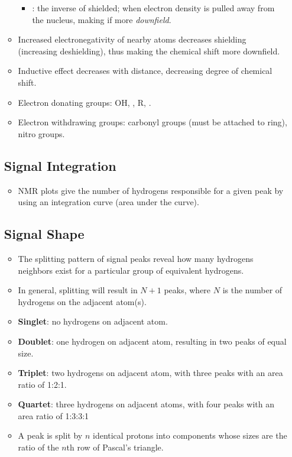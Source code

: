 \begin{itemize}
\begin{itemize}
\begin{itemize}
            \item {}: the inverse of shielded; when electron density is pulled away from the nucleus, making if more \emph{downfield}. 
          \end{itemize}
        \item Increased electronegativity of nearby atoms decreases shielding (increasing deshielding), thus making the chemical shift more downfield.
        \item Inductive effect decreases with distance, decreasing degree of chemical shift.
        \item Electron donating groups: OH, , R, .
        \item Electron withdrawing groups: carbonyl groups (must be attached to ring), nitro groups.
    \end{itemize}
    
    \subsection{Signal Integration}\label{Signal Integration}
    \begin{itemize}
        \item NMR plots give the number of hydrogens responsible for a given peak by using an integration curve (area under the curve). 
    \end{itemize}

    \subsection{Signal Shape}\label{Signal Shape}
    \begin{itemize}
        \item The splitting pattern of signal peaks reveal how many hydrogens neighbors exist for a particular group of equivalent hydrogens.
        \item In general, splitting will result in \(N + 1\) peaks, where \(N\) is the number of hydrogens on the adjacent atom(s).
        \item \textbf{Singlet}: no hydrogens on adjacent atom.
        \item \textbf{Doublet}: one hydrogen on adjacent atom, resulting in two peaks of equal size.
        \item \textbf{Triplet}: two hydrogens on adjacent atom, with three peaks with an area ratio of 1:2:1.
        \item \textbf{Quartet}: three hydrogens on adjacent atoms, with four peaks with an area ratio of 1:3:3:1
        \item A peak is split by \(n\) identical protons into components whose sizes are the ratio of the \(n\)th row of Pascal's triangle.
        
    \end{itemize}  
\end{itemize}

\begin{center}\large
          
  \bigskip

\end{center}